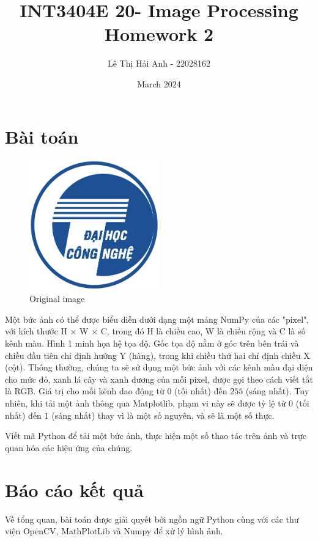 \documentclass[a4paper]{article}
\begin{document}
{\fontsize{36}{12}\selectfont
\title{INT3404E 20- Image Processing Homework 2}
\author{Lê Thị Hải Anh - 22028162}
\date{March 2024}
}

\maketitle
\section{Bài toán}

\begin{figure}[ht]
  \centering
  \includegraphics[width=0.5\textwidth]{images/uet.png}
  \caption{Original image}
\end{figure}

Một bức ảnh có thể được biểu diễn dưới dạng một mảng NumPy của các "pixel", với kích thước H × W × C, trong đó H là chiều cao, W là chiều rộng và C là số kênh màu. Hình 1 minh họa hệ tọa độ. Gốc tọa độ nằm ở góc trên bên trái và chiều đầu tiên chỉ định hướng Y (hàng), trong khi chiều thứ hai chỉ định chiều X (cột). Thông thường, chúng ta sẽ sử dụng một bức ảnh với các kênh màu đại diện cho mức đỏ, xanh lá cây và xanh dương của mỗi pixel, được gọi theo cách viết tắt là RGB. Giá trị cho mỗi kênh dao động từ $0$ (tối nhất) đến $255$ (sáng nhất). Tuy nhiên, khi tải một ảnh thông qua Matplotlib, phạm vi này sẽ được tỷ lệ từ $0$ (tối nhất) đến $1$ (sáng nhất) thay vì là một số nguyên, và sẽ là một số thực.

Viết mã Python để tải một bức ảnh, thực hiện một số thao tác trên ảnh và trực quan hóa các hiệu ứng của chúng.

\clearpage
\section{Báo cáo kết quả}
Về tổng quan, bài toán được giải quyết bởi ngồn ngữ Python cùng với các thư viện OpenCV, MathPlotLib và Numpy để xử lý hình ảnh.
\end{document}
